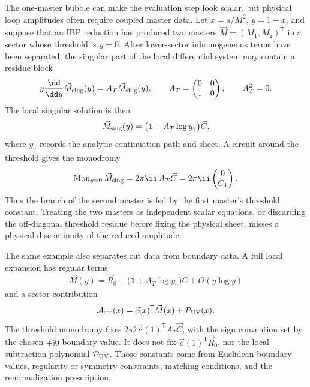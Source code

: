 \begin{construction}
\label{constr:two-master-threshold-mixing}
The one-master bubble can make the evaluation step look scalar, but physical
loop amplitudes often require coupled master data.  Let \(x=s/M^2\), \(y=1-x\),
and suppose that an IBP
reduction has produced two masters
\(\vec M=(M_1,M_2)^{\mathsf T}\) in a sector whose threshold is \(y=0\).
After lower-sector inhomogeneous terms have been separated, the singular
part of the local differential system may contain a residue block
\begin{equation}
  y\frac{\dd}{\dd y}\vec M_{\rm sing}(y)
  =
  A_T\vec M_{\rm sing}(y),
  \qquad
  A_T=
  \begin{pmatrix}
    0&0\\
    1&0
  \end{pmatrix},
  \qquad
  A_T^2=0 .
  \label{eq:two-master-threshold-nilpotent-block}
\end{equation}
The local singular solution is then
\begin{equation}
  \vec M_{\rm sing}(y)
  =
  \bigl(\mathbf 1+A_T\log y_\gamma\bigr)\vec C,
  \label{eq:two-master-threshold-local-solution}
\end{equation}
where \(y_\gamma\) records the analytic-continuation path and sheet.  A circuit
around the threshold gives the monodromy
\begin{equation}
  \operatorname{Mon}_{y=0}\vec M_{\rm sing}
  =
  2\pi\ii\,A_T\vec C
  =
  2\pi\ii
  \begin{pmatrix}
    0\\ C_1
  \end{pmatrix}.
  \label{eq:two-master-threshold-monodromy}
\end{equation}
Thus the branch of the second master is fed by the first master's threshold
constant.  Treating the two masters as independent scalar equations, or
discarding the off-diagonal threshold residue before fixing the physical
sheet, misses a physical discontinuity of the reduced amplitude.

The same example also separates cut data from boundary data.  A full local
expansion has regular terms
\[
  \vec M(y)=\vec R_0+\bigl(\mathbf 1+A_T\log y_\gamma\bigr)\vec C+O(y\log y)
\]
and a sector contribution
\begin{equation}
  \mathcal A_{\rm sec}(x)
  =
  \vec c(x)^{\mathsf T}\vec M(x)+\mathcal P_{\rm UV}(x).
  \label{eq:two-master-sector-amplitude}
\end{equation}
The threshold monodromy fixes
\(2\pi\ii\,\vec c(1)^{\mathsf T}A_T\vec C\), with the sign convention set by
the chosen \(+\ii0\) boundary value.  It does not fix
\(\vec c(1)^{\mathsf T}\vec R_0\), nor the local subtraction polynomial
\(\mathcal P_{\rm UV}\).  Those constants come from Euclidean boundary
values, regularity or symmetry constraints, matching conditions, and the
renormalization prescription.


\end{construction}
